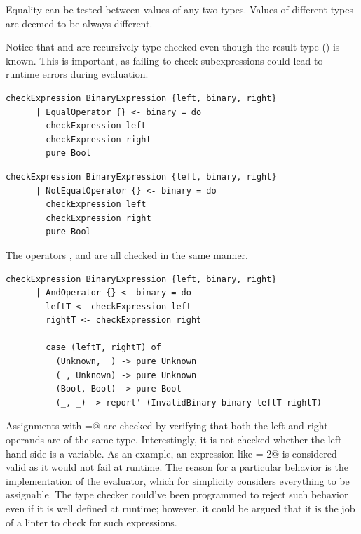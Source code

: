 \documentclass[UdineBachThesis,american,11pt,draft]{PhdThesis}
\begin{document}
  Equality can be tested between values of any two types. Values of different
  types are deemed to be always different.

  Notice that \lstinline@left@ and \lstinline@right@ are recursively type
  checked even though the result type (\lstinline@Bool@) is known. This is
  important, as failing to check subexpressions could lead to runtime errors
  during evaluation.

  \begin{lstlisting}[gobble=4,basicstyle=\ttfamily\small]
    checkExpression BinaryExpression {left, binary, right}
      | EqualOperator {} <- binary = do
        checkExpression left
        checkExpression right
        pure Bool
  \end{lstlisting}

  \begin{lstlisting}[gobble=4,basicstyle=\ttfamily\small]
    checkExpression BinaryExpression {left, binary, right}
      | NotEqualOperator {} <- binary = do
        checkExpression left
        checkExpression right
        pure Bool
  \end{lstlisting}

  The operators \lstinline@and@, \lstinline@or@ and \lstinline@xor@ are all
  checked in the same manner.

  \begin{lstlisting}[gobble=4,basicstyle=\ttfamily\small]
    checkExpression BinaryExpression {left, binary, right}
      | AndOperator {} <- binary = do
        leftT <- checkExpression left
        rightT <- checkExpression right

        case (leftT, rightT) of
          (Unknown, _) -> pure Unknown
          (_, Unknown) -> pure Unknown
          (Bool, Bool) -> pure Bool
          (_, _) -> report' (InvalidBinary binary leftT rightT)
  \end{lstlisting}

  Assignments with \lstinline@=@ are checked by verifying that both the left and
  right operands are of the same type. Interestingly, it is not checked whether
  the left-hand side is a variable. As an example, an expression like
   = 2@ is considered valid as it would not fail at runtime. The
  reason for a particular behavior is the implementation of the evaluator, which
  for simplicity considers everything to be assignable. The type checker
  could've been programmed to reject such behavior even if it is well defined at
  runtime; however, it could be argued that it is the job of a linter to check
  for such expressions.
\end{document}
